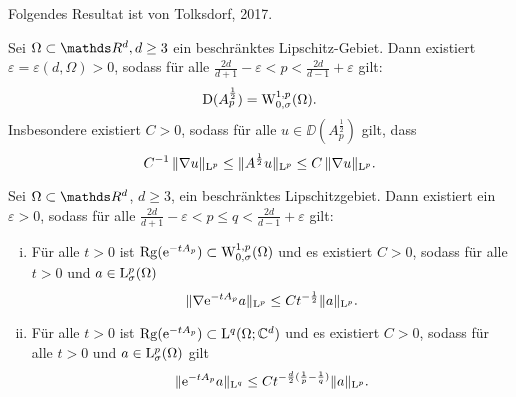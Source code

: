 Folgendes Resultat ist von Tolksdorf, 2017.

\begin{hsatz}
  \label{hsatz:tolksdorf}
  Sei $\Omega \subset \R^d, d \geq 3$ ein beschränktes Lipschitz-Gebiet.
  Dann existiert $\varepsilon = \varepsilon(d,\Omega) > 0$, sodass für alle 
  $
  \frac{2d}{d + 1} - \varepsilon < p < \frac{2d}{d - 1} + \varepsilon
  $
  gilt:
  $$
  \mathrm{D}(A_p^{\frac{1}{2}}) = \mathrm{W}_{0,\sigma}^{1,p}(\Omega).
  $$
  Insbesondere existiert $C > 0$, sodass für alle $u \in \DD(A_p^{\frac{1}{2}})$ gilt, dass
  $$
  C^{-1} \, \|\nabla u\|_{\mathrm{L}^p} \leq \| A^{\frac{1}{2}} u\|_{\mathrm{L}^p} \leq C \, \|\nabla u\|_{\mathrm{L}^p}.
  $$
\end{hsatz}

\begin{thm}
  Sei $\Omega \subset \R^d$, $d \geq 3$, ein beschränktes Lipschitzgebiet.
  Dann existiert ein $\varepsilon >0$, sodass für alle $\frac{2d}{d + 1} - \varepsilon < p \leq q < \frac{2d}{d - 1} + \varepsilon$ gilt:
  \begin{enumerate}[i)]
    \item Für alle $t > 0$ ist $\operatorname{Rg}(\mathrm{e}^{-tA_p}) \subset \mathrm{W}_{0,\sigma}^{1,p}(\Omega)$ und es existiert $C > 0$, sodass für alle $t > 0$ und $a \in \mathrm{L}_\sigma^p(\Omega)$
      $$
      \|\nabla \mathrm{e}^{-tA_p} a \|_{\mathrm{L}^p} \leq C t^{-\frac{1}{2}} \|a\|_{\mathrm{L}^p}.
      $$
    \item Für alle $t > 0$ ist $\operatorname{Rg}(\mathrm{e}^{-t A_p}) \subset \mathrm{L}^q(\Omega; \mathbb{C}^d)$ und es existiert $C > 0$, sodass für alle $t > 0$ und $a \in \mathrm{L}_\sigma^p(\Omega)$ gilt
      $$
      \|\mathrm{e}^{-tA_p} a\|_{\mathrm{L}^q} \leq C t^{-\frac{d}{2}(\frac{1}{p} - \frac{1}{q})} \|a\|_{\mathrm{L}^p}.
      $$
  \end{enumerate}
\end{thm}

